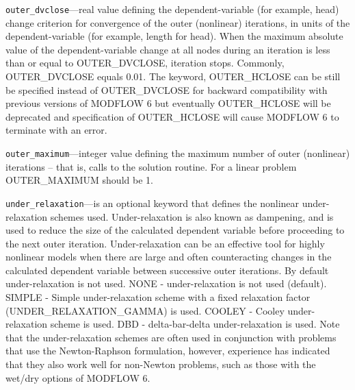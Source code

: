 \begin{description}
\item \texttt{outer\_dvclose}---real value defining the dependent-variable (for example, head) change criterion for convergence of the outer (nonlinear) iterations, in units of the dependent-variable (for example, length for head). When the maximum absolute value of the dependent-variable change at all nodes during an iteration is less than or equal to OUTER\_DVCLOSE, iteration stops. Commonly, OUTER\_DVCLOSE equals 0.01. The keyword, OUTER\_HCLOSE can be still be specified instead of OUTER\_DVCLOSE for backward compatibility with previous versions of MODFLOW 6 but eventually OUTER\_HCLOSE will be deprecated and specification of OUTER\_HCLOSE will cause MODFLOW 6 to terminate with an error.

\item \texttt{outer\_maximum}---integer value defining the maximum number of outer (nonlinear) iterations -- that is, calls to the solution routine. For a linear problem OUTER\_MAXIMUM should be 1.

\item \texttt{under\_relaxation}---is an optional keyword that defines the nonlinear under-relaxation schemes used. Under-relaxation is also known as dampening, and is used to reduce the size of the calculated dependent variable before proceeding to the next outer iteration.  Under-relaxation can be an effective tool for highly nonlinear models when there are large and often counteracting changes in the calculated dependent variable between successive outer iterations.  By default under-relaxation is not used.  NONE - under-relaxation is not used (default). SIMPLE - Simple under-relaxation scheme with a fixed relaxation factor (UNDER\_RELAXATION\_GAMMA) is used.  COOLEY - Cooley under-relaxation scheme is used.  DBD - delta-bar-delta under-relaxation is used.  Note that the under-relaxation schemes are often used in conjunction with problems that use the Newton-Raphson formulation, however, experience has indicated that they also work well for non-Newton problems, such as those with the wet/dry options of MODFLOW 6.


\end{description}
